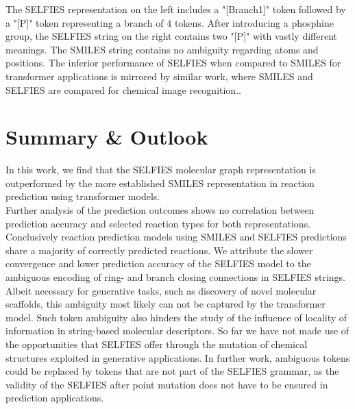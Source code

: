 \documentclass[10pt,conference,compsocconf]{IEEEtran}
\begin{document}
The SELFIES representation on the left includes a "[Branch1]" token followed by a "[P]" token representing a branch of 4 tokens. After introducing a phosphine group, the SELFIES string on the right contains two "[P]" with vastly different meanings. The SMILES string contains no ambiguity regarding atoms and positions. The inferior performance of SELFIES when compared to SMILES for transformer applications is mirrored by similar work, where SMILES and SELFIES are compared for chemical image recognition.\cite{Rajan2021}.

\section{Summary \& Outlook}

In this work, we find that the SELFIES molecular graph representation is outperformed by the more established SMILES representation in reaction prediction using transformer models.\\

Further analysis of the prediction outcomes shows no correlation between prediction accuracy and selected reaction types for both representations. Conclusively reaction prediction models using SMILES and SELFIES predictions share a majority of correctly predicted reactions. We attribute the slower convergence and lower prediction accuracy of the SELFIES model to the ambiguous encoding of ring- and branch closing connections in SELFIES strings. Albeit necessary for generative tasks, such as discovery of novel molecular scaffolds, this ambiguity most likely can not be captured by the transformer model. Such token ambiguity also hinders the study of the influence of locality of information in string-based molecular descriptors. So far we have not made use of the opportunities that SELFIES offer through the mutation of chemical structures exploited in generative applications. In further work, ambiguous tokens could be replaced by tokens that are not part of the SELFIES grammar, as the validity of the SELFIES after point mutation does not have to be ensured in prediction applications.

\end{document}
